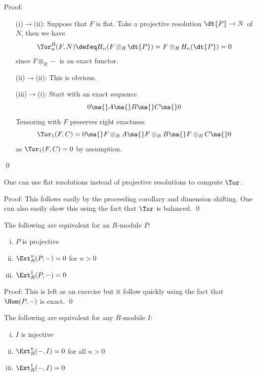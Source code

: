 \noindent Proof:
\begin{enumerate}
\item[(i)$\to$(ii):] Suppose that $F$ is flat. Take a projective resolution $\dt{P} \to N$ of $N$, then we have
\[
\Tor_n^R(F,N) \defeq H_n(F \otimes_R \dt{P})= F \otimes_R H_n(\dt{P})=0
\]
since $F\otimes_R -$ is an exact functor. 

\item[(ii)$\to$(ii):] This is obvious.

\item[(iii)$\to$(i):] Start with an exact sequence
\[
0 \ma{} A \ma{} B \ma{} C \ma{} 0
\]
Tensoring with $F$ preserves right exactness
\[
\Tor_1(F,C)=0 \ma{} F \otimes_R A \ma{} F \otimes_R B \ma{} F \otimes_R C \ma{} 0
\]
as $\Tor_1(F,C)=0$ by assumption. 
\end{enumerate}
\qed \\

\begin{cor}
One can use flat resolutions instead of projective resolutions to compute $\Tor$.
\end{cor}

\noindent Proof: This follows easily by the proceeding corollary and dimension shifting. One can also easily show this using the fact that $\Tor$ is balanced. \qed \\

\begin{prop}
The following are equivalent for an $R$-module $P$:
\begin{enumerate}[(i)]
\item $P$ is projective
\item $\Ext^n_R(P,-)=0$ for $n>0$
\item $\Ext_R^1(P,-)=0$
\end{enumerate}
\end{prop}

\noindent Proof: This is left as an exercise but it follow quickly using the fact that $\Hom(P,-)$ is exact. \qed \\

\begin{prop}
The following are equivalent for any $R$-module $I$:
\begin{enumerate}[(i)]
\item $I$ is injective
\item $\Ext_R^n(-,I)=0$ for all $n>0$
\item $\Ext_R^1(-,I)=0$
\end{enumerate}
\end{prop}

